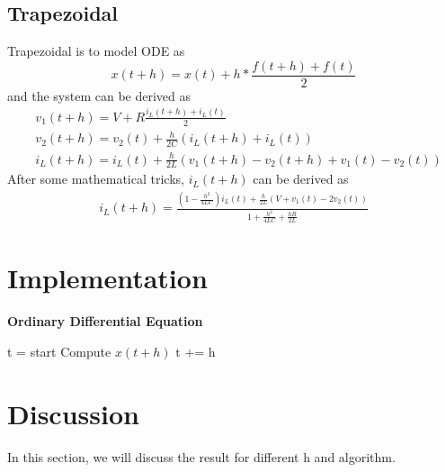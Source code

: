 \documentclass{article}
\begin{document}
\subsection{Trapezoidal}
\label{sec:trap}
Trapezoidal is to model ODE as 
$$
    x(t + h) = x(t) + h * \frac{f(t+h) + f(t)}{2}
$$
and the system can be derived as
\begin{align}
    & v_1(t+h) = V + R\frac{i_L(t+h) + i_L(t)}{2} \\
    & v_2(t+h) = v_2(t) + \frac{h}{2C}(i_L(t+h) + i_L(t)) \\
    & i_L(t+h) = i_L(t) + \frac{h}{2L}(v_1(t+h) - v_2(t+h) + v_1(t) - v_2(t))
\end{align}
After some mathematical tricks, $i_L(t+h)$ can be derived as
\begin{align}
    i_L(t+h) = \frac{(1-\frac{h^2}{4LC})i_L(t) + \frac{h}{2L}(V + v_1(t) - 2v_2(t))}{1 + \frac{h^2}{4LC} + \frac{hR}{2L}}
\end{align}

\section{Implementation}
\begin{algorithm}[H]
    \caption{\textbf{Ordinary Differential Equation}}
    \begin{algorithmic}
        \State t = start
            \State Compute $x(t+h)$
            \State t += h
        \EndWhile
    \end{algorithmic}
\end{algorithm}

\section{Discussion}
In this section, we will discuss the result for different h and algorithm.
\end{document}
